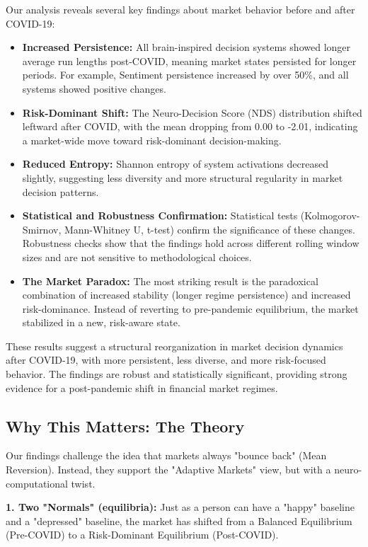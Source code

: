 \documentclass[conference]{IEEEtran}
\begin{document}
Our analysis reveals several key findings about market behavior before and after COVID-19:
\begin{itemize}
	\item \textbf{Increased Persistence:} All brain-inspired decision systems showed longer average run lengths post-COVID, meaning market states persisted for longer periods. For example, Sentiment persistence increased by over 50\%, and all systems showed positive changes.
	\item \textbf{Risk-Dominant Shift:} The Neuro-Decision Score (NDS) distribution shifted leftward after COVID, with the mean dropping from 0.00 to -2.01, indicating a market-wide move toward risk-dominant decision-making.
	\item \textbf{Reduced Entropy:} Shannon entropy of system activations decreased slightly, suggesting less diversity and more structural regularity in market decision patterns.
	\item \textbf{Statistical and Robustness Confirmation:} Statistical tests (Kolmogorov-Smirnov, Mann-Whitney U, t-test) confirm the significance of these changes. Robustness checks show that the findings hold across different rolling window sizes and are not sensitive to methodological choices.
	\item \textbf{The Market Paradox:} The most striking result is the paradoxical combination of increased stability (longer regime persistence) and increased risk-dominance. Instead of reverting to pre-pandemic equilibrium, the market stabilized in a new, risk-aware state.
\end{itemize}

These results suggest a structural reorganization in market decision dynamics after COVID-19, with more persistent, less diverse, and more risk-focused behavior. The findings are robust and statistically significant, providing strong evidence for a post-pandemic shift in financial market regimes.

\subsection{Why This Matters: The Theory}

Our findings challenge the idea that markets always "bounce back" (Mean Reversion). Instead, they support the "Adaptive Markets" view, but with a neuro-computational twist.

\textbf{1. Two "Normals" (equilibria):} Just as a person can have a "happy" baseline and a "depressed" baseline, the market has shifted from a Balanced Equilibrium (Pre-COVID) to a Risk-Dominant Equilibrium (Post-COVID).
\end{document}
